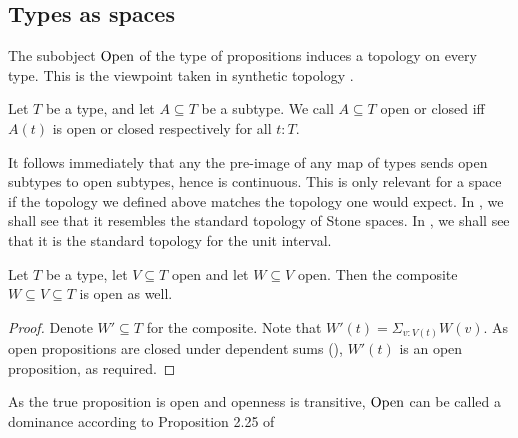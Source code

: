 \subsection{Types as spaces}
The subobject $\mathrm{Open}$ of the type of propositions induces a topology on every type. 
This is the viewpoint taken in synthetic topology \cite{SyntheticTopologyLesnik}. 

\begin{definition}
  Let $T$ be a type, and let $A\subseteq T$ be a subtype. 
  We call $A\subseteq T$ open or closed iff $A(t)$ is open or closed respectively for all $t:T$.
\end{definition}

\begin{remark}
  It follows immediately that any the pre-image of any map of types sends 
  open subtypes to open subtypes, hence is continuous. 
  This is only relevant for a space if the topology we defined above matches the topology one would expect. 
  In , we shall see that it resembles the standard topology of Stone spaces.
  In , we shall see that it is the standard topology for the unit interval. 
\end{remark}

\begin{lemma}
  Let $T$ be a type, let $V\subseteq T$ open and let $W\subseteq V$ open. 
  Then the composite $W\subseteq V\subseteq T$ is open as well. 
\end{lemma}
\begin{proof}
  Denote $W'\subseteq T$ for the composite. 
  Note that $W'(t) = \Sigma_{v:V(t)} W(v)$. 
  As open propositions are closed under dependent sums (), 
  $W'(t)$ is an open proposition, as required. 
\end{proof}

\begin{remark}
  As the true proposition is open and openness is transitive, 
  $\mathrm{Open}$ can be called a dominance according to Proposition 2.25 of \cite{SyntheticTopologyLesnik}
\end{remark}

